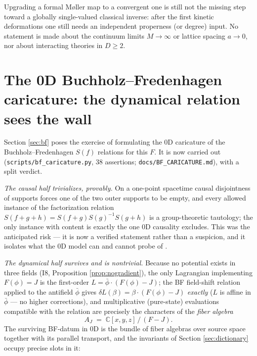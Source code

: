 \documentclass[11pt]{article}
\theoremstyle{definition}
\theoremstyle{remark}
\newcommand{\C}{\mathbb{C}}
\begin{document}
Upgrading a formal M{\o}ller map to a convergent one is still not the
missing step toward a globally single-valued classical inverse: after
the first kinetic deformations one still needs an independent
properness (or degree) input. No statement is made about the continuum
limits $M\to\infty$ or lattice spacing $a\to0$, nor about interacting
theories in $D\ge 2$.

\section{The 0D Buchholz--Fredenhagen caricature: the dynamical
relation sees the wall}\label{sec:bfcar}

Section \ref{sec:bf} poses the exercise of formulating the 0D
caricature of the Buchholz--Fredenhagen $S(f)$ relations \cite{BF20}
for this $F$. It is now carried out
(\texttt{scripts/bf\_caricature.py}, 38 assertions;
\texttt{docs/BF\_CARICATURE.md}), with a split verdict.

\emph{The causal half trivializes, provably.} On a one-point spacetime
causal disjointness of supports forces one of the two outer supports
to be empty, and every allowed instance of the factorization relation
$S(f{+}g{+}h)=S(f{+}g)S(g)^{-1}S(g{+}h)$ is a group-theoretic
tautology; the only instance with content is exactly the one 0D
causality excludes. This was the anticipated risk — it is now a
verified statement rather than a suspicion, and it isolates what the
0D model can and cannot probe of \cite{BF20}.

\emph{The dynamical half survives and is nontrivial.} Because no
potential exists in three fields (I8, Proposition
\ref{prop:nogradient}), the only Lagrangian implementing $F(\phi)=J$
is the first-order $L=\bar\phi\cdot(F(\phi)-J)$; the BF field-shift
relation applied to the antifield $\bar\phi$ gives
$\delta L(\beta)=\beta\cdot(F(\phi)-J)$ \emph{exactly} ($L$ is affine
in $\bar\phi$ — no higher corrections), and multiplicative
(pure-state) evaluations compatible with the relation are precisely
the characters of the \emph{fiber algebra}
\[
A_J \;=\; \C[x,y,z]\,/\,(F-J).
\]
The surviving BF-datum in 0D is the bundle of fiber algebras over
source space together with its parallel transport, and the invariants
of Section \ref{sec:dictionary} occupy precise slots in it:
\end{document}
